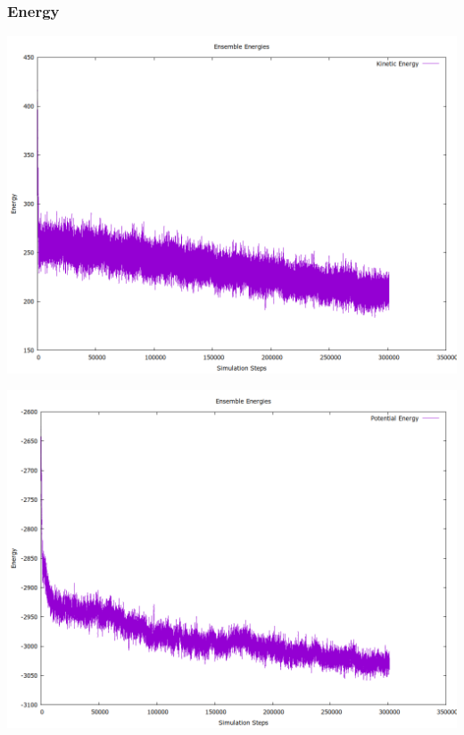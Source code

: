 \documentclass[a4paper,11pt,twoside]{article}
\begin{document}
\subsubsection{Energy}
\label{sec:org4a016e6}
\begin{center}
\includegraphics[width=.9\linewidth]{../../runs/nvt_cool_sample/plots/N_501_T_0.28/ke.png}
\end{center}

\begin{center}
\includegraphics[width=.9\linewidth]{../../runs/nvt_cool_sample/plots/N_501_T_0.28/pe.png}
\end{center}
\end{document}
